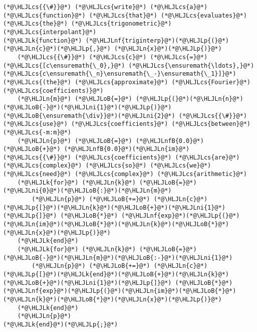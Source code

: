 \documentclass[12pt,landscape]{article}
\newcommand{\HLJLk}[1]{\textcolor[RGB]{148,91,176}{\textbf{#1}}}
\newcommand{\HLJLn}[1]{#1}
\newcommand{\HLJLnf}[1]{\textcolor[RGB]{66,102,213}{#1}}
\newcommand{\HLJLnfB}[1]{\textcolor[RGB]{59,151,46}{#1}}
\newcommand{\HLJLni}[1]{\textcolor[RGB]{59,151,46}{#1}}
\newcommand{\HLJLoB}[1]{\textcolor[RGB]{102,102,102}{\textbf{#1}}}
\newcommand{\HLJLp}[1]{#1}
\newcommand{\HLJLcs}[1]{\textcolor[RGB]{153,153,119}{\textit{#1}}}
\begin{document}
{\begin{lstlisting}
(*@\HLJLcs{{\#}}@*) (*@\HLJLcs{write}@*) (*@\HLJLcs{a}@*) (*@\HLJLcs{function}@*) (*@\HLJLcs{that}@*) (*@\HLJLcs{evaluates}@*) (*@\HLJLcs{the}@*) (*@\HLJLcs{trigonometric}@*) (*@\HLJLcs{interpolant}@*)
(*@\HLJLk{function}@*) (*@\HLJLnf{triginterp}@*)(*@\HLJLp{(}@*)(*@\HLJLn{c}@*)(*@\HLJLp{,}@*) (*@\HLJLn{x}@*)(*@\HLJLp{)}@*)
    (*@\HLJLcs{{\#}}@*) (*@\HLJLcs{c}@*) (*@\HLJLcs{=}@*) (*@\HLJLcs{[c\ensuremath{\_0},}@*) (*@\HLJLcs{\ensuremath{\ldots},}@*) (*@\HLJLcs{c\ensuremath{\_n}\ensuremath{\_-}\ensuremath{\_1}]}@*) (*@\HLJLcs{(the}@*) (*@\HLJLcs{approximate}@*) (*@\HLJLcs{Fourier}@*) (*@\HLJLcs{coefficients)}@*)
    (*@\HLJLn{m}@*) (*@\HLJLoB{=}@*) (*@\HLJLp{(}@*)(*@\HLJLn{n}@*)(*@\HLJLoB{-}@*)(*@\HLJLni{1}@*)(*@\HLJLp{)}@*)(*@\HLJLoB{\ensuremath{\div}}@*)(*@\HLJLni{2}@*) (*@\HLJLcs{{\#}}@*) (*@\HLJLcs{use}@*) (*@\HLJLcs{coefficients}@*) (*@\HLJLcs{between}@*) (*@\HLJLcs{-m:m}@*)
    (*@\HLJLn{p}@*) (*@\HLJLoB{=}@*) (*@\HLJLnfB{0.0}@*) (*@\HLJLoB{+}@*) (*@\HLJLnfB{0.0}@*)(*@\HLJLn{im}@*) (*@\HLJLcs{{\#}}@*) (*@\HLJLcs{coefficients}@*) (*@\HLJLcs{are}@*) (*@\HLJLcs{complex}@*) (*@\HLJLcs{so}@*) (*@\HLJLcs{we}@*) (*@\HLJLcs{need}@*) (*@\HLJLcs{complex}@*) (*@\HLJLcs{arithmetic}@*)
    (*@\HLJLk{for}@*) (*@\HLJLn{k}@*) (*@\HLJLoB{=}@*) (*@\HLJLni{0}@*)(*@\HLJLoB{:}@*)(*@\HLJLn{m}@*)
        (*@\HLJLn{p}@*) (*@\HLJLoB{+=}@*) (*@\HLJLn{c}@*)(*@\HLJLp{[}@*)(*@\HLJLn{k}@*)(*@\HLJLoB{+}@*)(*@\HLJLni{1}@*)(*@\HLJLp{]}@*) (*@\HLJLoB{*}@*) (*@\HLJLnf{exp}@*)(*@\HLJLp{(}@*)(*@\HLJLn{im}@*)(*@\HLJLoB{*}@*)(*@\HLJLn{k}@*)(*@\HLJLoB{*}@*)(*@\HLJLn{x}@*)(*@\HLJLp{)}@*)
    (*@\HLJLk{end}@*)
    (*@\HLJLk{for}@*) (*@\HLJLn{k}@*) (*@\HLJLoB{=}@*) (*@\HLJLoB{-}@*)(*@\HLJLn{m}@*)(*@\HLJLoB{:-}@*)(*@\HLJLni{1}@*)
        (*@\HLJLn{p}@*) (*@\HLJLoB{+=}@*) (*@\HLJLn{c}@*)(*@\HLJLp{[}@*)(*@\HLJLk{end}@*)(*@\HLJLoB{+}@*)(*@\HLJLn{k}@*)(*@\HLJLoB{+}@*)(*@\HLJLni{1}@*)(*@\HLJLp{]}@*) (*@\HLJLoB{*}@*) (*@\HLJLnf{exp}@*)(*@\HLJLp{(}@*)(*@\HLJLn{im}@*)(*@\HLJLoB{*}@*)(*@\HLJLn{k}@*)(*@\HLJLoB{*}@*)(*@\HLJLn{x}@*)(*@\HLJLp{)}@*)
    (*@\HLJLk{end}@*)
    (*@\HLJLn{p}@*)
(*@\HLJLk{end}@*)(*@\HLJLp{;}@*)
\end{lstlisting}


}
\end{document}
